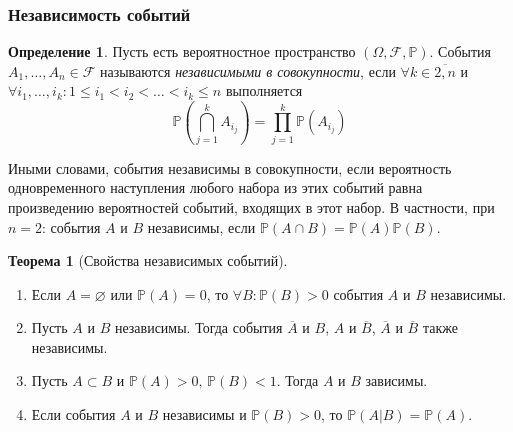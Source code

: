 \documentclass[oneside,final,14pt]{extreport}
\newcommand\myprob[1]{{\mathbb{P}(#1)}}
\theoremstyle{plain}
\theoremstyle{definition}
\newtheorem*{defn}{Определение}
\theoremstyle{named}
\newtheorem*{namedthm}{Теорема}
\begin{document}
\subsubsection{Независимость событий}

\begin{defn}
    Пусть есть вероятностное пространство $(\Omega, \mathcal{F}, \mathbb{P})$. События $A_1, \ldots, A_n \in \mathcal{F}$ называются {\it независимыми в совокупности}, если $\forall k \in \overline{2, n}$ и $\forall i_{1}, \ldots, i_{k} \colon 1 \leqslant i_1 < i_2 < \ldots < i_k \leqslant n$ выполняется 
    \begin{equation*}
        \mathbb{P}\left(\bigcap\limits_{j=1}^k A_{i_j}\right) = \prod\limits_{j=1}^k \myprob{A_{i_j}}
    \end{equation*}

Иными словами, события независимы в совокупности, если вероятность одновременного наступления любого набора из этих событий равна произведению вероятностей событий, входящих в этот набор. В частности, при $n = 2$: события $A$ и $B$ независимы, если $\myprob{A \cap B} = \myprob{A}\myprob{B}$.
\end{defn}

\begin{namedthm}[Свойства независимых событий]\leavevmode
    \begin{enumerate}
        \item Если $A = \varnothing$ или $\myprob{A} = 0$, то $\forall B \colon \myprob{B} > 0$ события $A$ и $B$ независимы.
        \item Пусть $A$ и $B$ независимы. Тогда события $\overline{A}$ и $B$, $A$ и $\overline{B}$, $\overline{A}$ и $\overline{B}$ также независимы. 
        \item Пусть $A \subset B$ и $\myprob{A} > 0, \, \myprob{B} < 1$. Тогда $A$ и $B$ зависимы. 
        \item Если события $A$ и $B$ независимы и $\myprob{B} > 0$, то $\myprob{A|B} = \myprob{A}$.
    \end{enumerate}
\end{namedthm}
\end{document}
